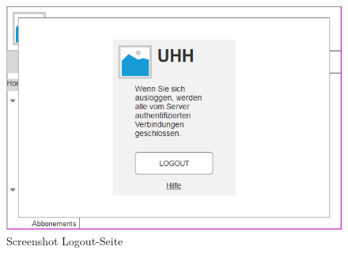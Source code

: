 \documentclass[a4paper,10pt]{article}
\begin{document}
\begin{enumerate}
\begin{enumerate}
\begin{figure}[H]
	\centering
	\includegraphics[width=1.0\textwidth]{Screenshot-Logout.png} 
	\caption{Screenshot Logout-Seite}
	\label{fig1}
\end{figure}
\end{enumerate}

\end{enumerate}
\end{document}
